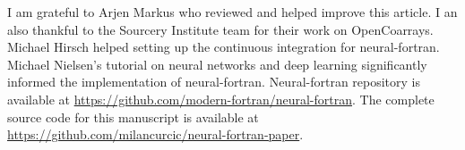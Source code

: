 \documentclass[sigplan, review=false, screen=true, balance=true]{acmart}
\begin{document}
\begin{acks}
I am grateful to Arjen Markus who reviewed and helped improve this article.
I an also thankful to the Sourcery Institute team for their work on OpenCoarrays. 
Michael Hirsch helped setting up the continuous integration for neural-fortran. 
Michael Nielsen's tutorial on neural networks and deep learning
significantly informed the implementation of neural-fortran.
Neural-fortran repository is available at
\url{https://github.com/modern-fortran/neural-fortran}.
The complete source code for this manuscript is available at
\url{https://github.com/milancurcic/neural-fortran-paper}.
\end{acks}



\end{document}
